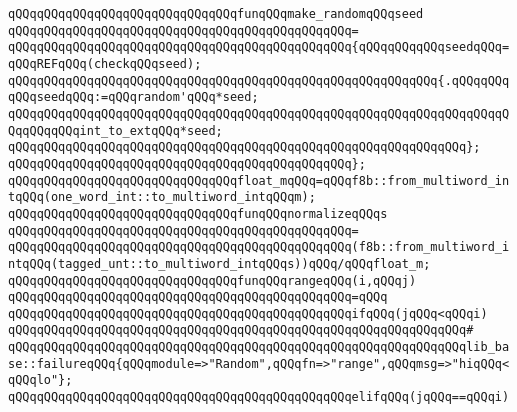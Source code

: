 \newline
\verb|qQQqqQQqqQQqqQQqqQQqqQQqqQQqqQQqfunqQQqmake_randomqQQqseed|\newline
\verb|qQQqqQQqqQQqqQQqqQQqqQQqqQQqqQQqqQQqqQQqqQQqqQQq=|\newline
\verb|qQQqqQQqqQQqqQQqqQQqqQQqqQQqqQQqqQQqqQQqqQQqqQQq{qQQqqQQqqQQqseedqQQq=qQQqREFqQQq(checkqQQqseed);|\newline
\newline
\verb|qQQqqQQqqQQqqQQqqQQqqQQqqQQqqQQqqQQqqQQqqQQqqQQqqQQqqQQqqQQq{.qQQqqQQqqQQqseedqQQq:=qQQqrandom'qQQq*seed;|\newline
\verb|qQQqqQQqqQQqqQQqqQQqqQQqqQQqqQQqqQQqqQQqqQQqqQQqqQQqqQQqqQQqqQQqqQQqqQQqqQQqqQQqint_to_extqQQq*seed;|\newline
\verb|qQQqqQQqqQQqqQQqqQQqqQQqqQQqqQQqqQQqqQQqqQQqqQQqqQQqqQQqqQQqqQQq};|\newline
\verb|qQQqqQQqqQQqqQQqqQQqqQQqqQQqqQQqqQQqqQQqqQQqqQQq};|\newline
\newline
\verb|qQQqqQQqqQQqqQQqqQQqqQQqqQQqqQQqfloat_mqQQq=qQQqf8b::from_multiword_intqQQq(one_word_int::to_multiword_intqQQqm);|\newline
\newline
\verb|qQQqqQQqqQQqqQQqqQQqqQQqqQQqqQQqfunqQQqnormalizeqQQqs|\newline
\verb|qQQqqQQqqQQqqQQqqQQqqQQqqQQqqQQqqQQqqQQqqQQqqQQq=|\newline
\verb|qQQqqQQqqQQqqQQqqQQqqQQqqQQqqQQqqQQqqQQqqQQqqQQq(f8b::from_multiword_intqQQq(tagged_unt::to_multiword_intqQQqs))qQQq/qQQqfloat_m;|\newline
\newline
\verb|qQQqqQQqqQQqqQQqqQQqqQQqqQQqqQQqfunqQQqrangeqQQq(i,qQQqj)|\newline
\verb|qQQqqQQqqQQqqQQqqQQqqQQqqQQqqQQqqQQqqQQqqQQqqQQq=qQQq|\newline
\verb|qQQqqQQqqQQqqQQqqQQqqQQqqQQqqQQqqQQqqQQqqQQqqQQqifqQQq(jqQQq<qQQqi)|\newline
\verb|qQQqqQQqqQQqqQQqqQQqqQQqqQQqqQQqqQQqqQQqqQQqqQQqqQQqqQQqqQQqqQQq#|\newline
\verb|qQQqqQQqqQQqqQQqqQQqqQQqqQQqqQQqqQQqqQQqqQQqqQQqqQQqqQQqqQQqqQQqlib_base::failureqQQq{qQQqmodule=>"Random",qQQqfn=>"range",qQQqmsg=>"hiqQQq<qQQqlo"};|\newline
\newline
\verb|qQQqqQQqqQQqqQQqqQQqqQQqqQQqqQQqqQQqqQQqqQQqqQQqelifqQQq(jqQQq==qQQqi)|\newline
\newline
